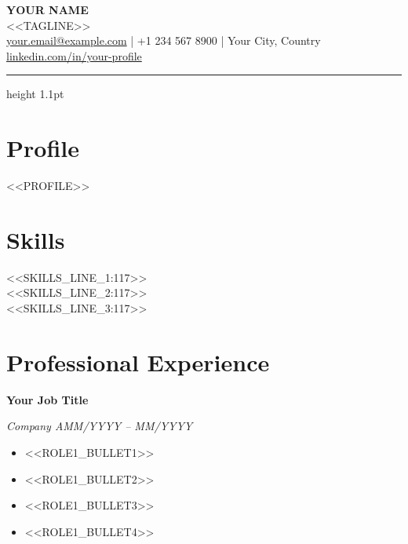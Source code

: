 \documentclass[10.5pt]{article}
\newcommand{\jobentry}[3]{%
  \par\vspace{2.5pt}
  \noindent
  {\bfseries\fontsize{10.5}{12}\selectfont #1}\par
  {\itshape\color{gray}\small #2}\hfill{\itshape\color{gray}\small #3}\par\vspace{0.5pt}
}
\begin{document}
{\fontsize{22}{24}\selectfont\bfseries YOUR NAME}\\[8pt]
{\fontsize{12}{14}\selectfont\color{navy} <<TAGLINE>>}\\[7pt]
{\small
  \href{mailto:your.email@example.com}{your.email@example.com} \;|\; +1 234 567 8900 \;|\; Your City, Country\\
  \href{https://linkedin.com/in/your-profile}{linkedin.com/in/your-profile}
}

\vspace{7pt}
{\color{navy}\hrule height 1.1pt}
\vspace{5pt}

\section{Profile}
\RaggedRight\small
<<PROFILE>>

\section{Skills}
\begingroup
\centering\small
<<SKILLS_LINE_1:117>>\\[2pt]
<<SKILLS_LINE_2:117>>\\[2pt]
<<SKILLS_LINE_3:117>>\par
\endgroup

\section{Professional Experience}

\jobentry{Your Job Title}{Company A}{MM/YYYY -- MM/YYYY}
\begin{itemize}
  \item <<ROLE1_BULLET1>>
  \item <<ROLE1_BULLET2>>
  \item <<ROLE1_BULLET3>>
  \item <<ROLE1_BULLET4>>
\end{itemize}
\end{document}
